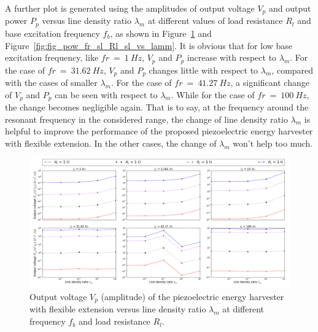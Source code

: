 \documentclass{elsarticle}
\begin{document}



A further plot is generated using the amplitudes of output voltage $V_p$ and output power $P_p$ versus line density ratio $\lambda_m$ at different values of load resistance $R_l$ and base excitation frequency $f_b$, as shown in Figure~\ref{fig:fig_vol_fr_sl_Rl_sl_vs_lamm} and Figure~\ref{fig:fig_pow_fr_sl_Rl_sl_vs_lamm}. It is obvious that for low base excitation frequency, like $fr\ =\ 1\ Hz$, $V_p$ and $P_p$ increase with respect to $\lambda_m$. For the case of $fr\ =\ 31.62 \ Hz$, $V_p$ and $P_p$ changes little with respect to $\lambda_m$, compared with the cases of smaller $\lambda_m$. For the case of $fr\ =\ 41.27 \ Hz$, a significant change of $V_p$ and $P_p$ can be seen with respect to $\lambda_m$. While for the case of $fr\ =\ 100 \ Hz$, the change becomes negligible again. That is to say, at the frequency around the resonant frequency in the considered range, the change of line density ratio $\lambda_m$ is helpful to improve the performance of the proposed piezoelectric energy harvester with flexible extension. In the other cases, the change of $\lambda_m$ won't help too much. 



\begin{figure}[!htbp]
    \centering
    \includegraphics[width=\textwidth]{./fig_vol_fr_sl_Rl_sl_vs_lamm}
    \caption{Output voltage $V_p$ (amplitude) of the piezoelectric energy harvester with flexible extension versus line density ratio $\lambda_m$ at different frequency $f_b$ and load resistance $R_l$. \color{red}{legend to be revised} }
    \label{fig:fig_vol_fr_sl_Rl_sl_vs_lamm}
\end{figure}
\end{document}
